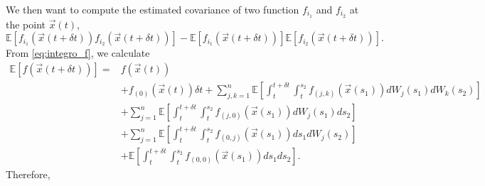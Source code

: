 \documentclass[12pt]{article}
\begin{document}
We then want to compute the estimated covariance of two function $f_{i_1}$ and $f_{i_2}$ at the point $\vec{x}(t)$, 
%
\begin{equation}
\mathbb{E}[f_{i_1}(\vec{x}(t + \delta t))f_{i_2}(\vec{x}(t + \delta t))] - \mathbb{E}[f_{i_1}(\vec{x}(t + \delta t))]\mathbb{E}[f_{i_2}(\vec{x}(t + \delta t))].
\end{equation}
%
From \eqref{eq:integro_f}, we calculate
\begin{equation} 
\begin{aligned}
\mathbb{E} [f(\vec{x}(t+\delta t))] =&
f(\vec{x}(t)) \\
&+  f_{(0)}(\vec{x}(t)) \delta t
+ \sum_{j, k=1}^n \mathbb{E} \left[ \int_t^{t+\delta t} \int_t^{s_2} f_{(j,k)}(\vec{x}(s_1)) dW_j(s_1) dW_k(s_2) \right] \\
&+ \sum_{j=1}^n \mathbb{E} \left[ \int_t^{t+\delta t} \int_t^{s_2} f_{(j,0)}(\vec{x}(s_1)) dW_j(s_1) ds_2  \right]\\
&+ \sum_{j=1}^n \mathbb{E} \left[  \int_t^{t+\delta t} \int_t^{s_2} f_{(0,j)}(\vec{x}(s_1)) ds_1 dW_j(s_2) \right] \\
&+ \mathbb{E} \left[ \int_t^{t+\delta t} \int_t^{s_2} f_{(0,0)}(\vec{x}(s_1)) ds_1 ds_2  \right].
\end{aligned}
\end{equation}
%
Therefore, 
%
\end{document}
